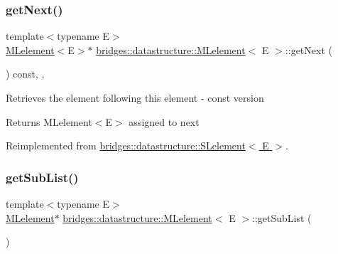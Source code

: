 \subsubsection{\texorpdfstring{get\+Next()}{getNext()}\hspace{0.1cm}{\footnotesize\ttfamily [2/2]}}
{\footnotesize\ttfamily template$<$typename E$>$ \\
\hyperlink{classbridges_1_1datastructure_1_1_m_lelement}{M\+Lelement}$<$E$>$$\ast$ \hyperlink{classbridges_1_1datastructure_1_1_m_lelement}{bridges\+::datastructure\+::\+M\+Lelement}$<$ E $>$\+::get\+Next (\begin{DoxyParamCaption}{ }\end{DoxyParamCaption}) const\hspace{0.3cm}{\ttfamily [inline]}, {\ttfamily [override]}, {\ttfamily [virtual]}}

Retrieves the element following this element -\/ const version

\begin{DoxyReturn}{Returns}
M\+Lelement$<$\+E$>$ assigned to next 
\end{DoxyReturn}


Reimplemented from \hyperlink{classbridges_1_1datastructure_1_1_s_lelement_a8c62cb82fa64bbfe9ebb7334a5fea417}{bridges\+::datastructure\+::\+S\+Lelement$<$ E $>$}.

\mbox{\label{classbridges_1_1datastructure_1_1_m_lelement_a9faeb30ffd023746ce36e05705a62b2d}} 
\subsubsection{\texorpdfstring{get\+Sub\+List()}{getSubList()}}
{\footnotesize\ttfamily template$<$typename E$>$ \\
\hyperlink{classbridges_1_1datastructure_1_1_m_lelement}{M\+Lelement}$\ast$ \hyperlink{classbridges_1_1datastructure_1_1_m_lelement}{bridges\+::datastructure\+::\+M\+Lelement}$<$ E $>$\+::get\+Sub\+List (\begin{DoxyParamCaption}{ }\end{DoxyParamCaption})\hspace{0.3cm}{\ttfamily [inline]}}

